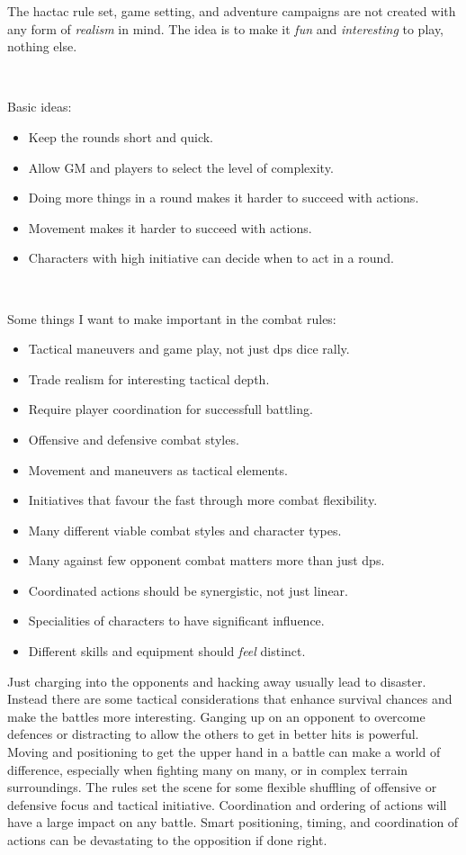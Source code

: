 The hactac rule set, game setting, and adventure campaigns are not created with any form of \emph{realism} in mind. The idea is to make it \emph{fun} and \emph{interesting} to play, nothing else.

\

Basic ideas:
\begin{itemize}
    \item Keep the rounds short and quick.
    \item Allow GM and players to select the level of complexity.
    \item Doing more things in a round makes it harder to succeed with actions.
    \item Movement makes it harder to succeed with actions.
    \item Characters with high initiative can decide when to act in a round.
\end{itemize}

\

Some things I want to make important in the combat rules:
\begin{itemize}
    \item Tactical maneuvers and game play, not just dps dice rally.
    \item Trade realism for interesting tactical depth.
    \item Require player coordination for successfull battling.
    \item Offensive and defensive combat styles.
    \item Movement and maneuvers as tactical elements.
    \item Initiatives that favour the fast through more combat flexibility.
    \item Many different viable combat styles and character types.
    \item Many against few opponent combat matters more than just dps.
    \item Coordinated actions should be synergistic, not just linear.
    \item Specialities of characters to have significant influence.
    \item Different skills and equipment should \emph{feel} distinct.
\end{itemize}

Just charging into the opponents and hacking away usually lead to disaster. Instead there are some tactical considerations that enhance survival chances and make the battles more interesting. Ganging up on an opponent to overcome defences or distracting to allow the others to get in better hits is powerful. Moving and positioning to get the upper hand in a battle can make a world of difference, especially when fighting many on many, or in complex terrain surroundings. The rules set the scene for some flexible shuffling of offensive or defensive focus and tactical initiative. Coordination and ordering of actions will have a large impact on any battle. Smart positioning, timing, and coordination of actions can be devastating to the opposition if done right.

